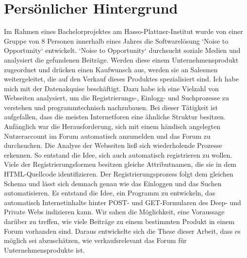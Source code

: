 \section{Persönlicher Hintergrund}
Im Rahmen eines Bachelorprojektes am Hasso-Plattner-Institut wurde von einer Gruppe von 8 Personen  innerhalb eines Jahres die Softwarelösung `Noise to Opportunity` entwickelt. `Noise to Opportunity` durchsucht soziale Medien und analysiert die gefundenen Beiträge. Werden diese einem Unternehmensprodukt zugeordnet und drücken einen Kaufwunsch aus, werden sie an Salesmen weitergeleitet, die auf den Verkauf dieses Produktes spezialisiert sind. Ich habe mich mit der Datenakquise beschäftigt. Dazu habe ich eine Vielzahl von Webseiten analysiert, um die Registrierungs-, Einlogg- und Suchprozesse zu verstehen und programmtechnisch nachzubauen. Bei dieser Tätigkeit ist aufgefallen, dass die meisten Internetforen eine ähnliche Struktur besitzen. Anfänglich war die Herausforderung, sich mit einem händisch angelegten Nutzeraccount im Forum automatisch anzumelden und das Forum zu durchsuchen. Die Analyse der Webseiten ließ sich wiederholende Prozesse erkennen. So entstand die Idee, sich auch automatisch registrieren zu wollen.
Viele der Registrierungsformen besitzen gleiche Attributnamen, die sie in dem HTML-Quellcode identifizieren. Der Registrierungsprozess folgt dem gleichen Schema und lässt sich demnach genau wie das Einloggen und das Suchen automatisieren. Es entstand die Idee, ein Programm zu entwickeln, das automatisch Internetinhalte hinter POST- und GET-Formularen des Deep- und Private Webs indizieren kann. Wir sahen die Möglichkeit, eine Voraussage darüber zu treffen, wie viele Beiträge zu einem bestimmten Produkt in einem Forum vorhanden sind.
Daraus entwickelte sich die These dieser Arbeit, dass es möglich sei abzuschätzen, wie verkaufsrelevant das Forum für Unternehmensprodukte ist.
\newpage